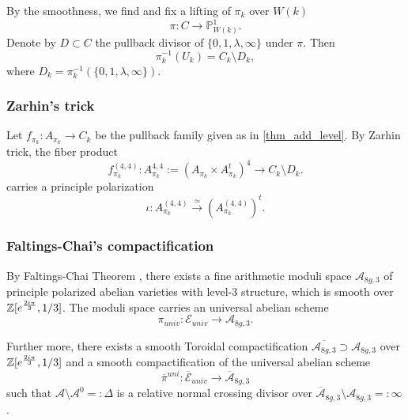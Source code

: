 \documentclass[12pt,twoside]{book}
\theoremstyle{plain}
\theoremstyle{definition}
\theoremstyle{remark}
\newcommand{\bP}{{\mathbb P}}
\newcommand{\mA}{{\mathcal A}}
\newcommand{\mE}{{\mathcal E}}
\numberwithin{equation}{section}
\begin{document}
By the smoothness, we find and fix a lifting of $\pi_k$ over $W(k)$
\[\pi\colon C\rightarrow \bP^1_{W(k)}.\]
Denote by $D\subset C$ the pullback divisor of $\{0,1,\lambda,\infty\}$ under $\pi$. Then
\[\pi_k^{-1}(U_k) = C_k\setminus D_k,\]
where $D_k = \pi_k^{-1}(\{0,1,\lambda,\infty\})$.

\subsubsection{Zarhin's trick} \label{sec_subsub_Zarhin}

Let $f_{\pi_k}\colon A_{\pi_k} \rightarrow C_k$ be the pullback family given as in \autoref{thm_add_level}. By Zarhin trick, the fiber product
\[ f^{(4,4)}_{\pi_k} : A^{4,4}_{\pi_k}:=(A_{\pi_k} \times A_{\pi_k}^t)^4 \to C_k\setminus D_k.\]
carries a principle polarization
\[\iota: A^{(4,4)}_{\pi_k} \xrightarrow{\simeq} \left(A_{\pi_k}^{(4,4)}\right)^t.\]

\subsubsection{Faltings-Chai's compactification}
By Faltings-Chai Theorem \cite{FaCh90}, there exists a fine arithmetic moduli space $\mathcal A_{8g,3}$ of principle polarized abelian varieties with level-$3$ structure, which is smooth over $\mathbb Z[e^{{2i \pi \over 3}},1/3]$. The moduli space carries
an universal abelian scheme
\[\pi_{univ} \colon \mE_{univ} \rightarrow \mA_{8g,3}.\]

Further more, there exists a smooth Toroidal compactification $\overline{\mA_{8g,3}} \supset \mA_{8g,3}$ over $\mathbb Z[e^{{2i \pi \over 3}},1/3]$ and a smooth compactification of the universal abelian scheme
\[\overline{\pi}^{uni}: \overline{\mE}_{univ} \to \overline{\mA}_{8g,3}\]
such that $\mathcal A \setminus \mathcal A^0=:\Delta$ is a relative normal crossing divisor over $\overline{\mA}_{8g,3}\setminus \mA_{8g,3}=:\infty$.
\end{document}
